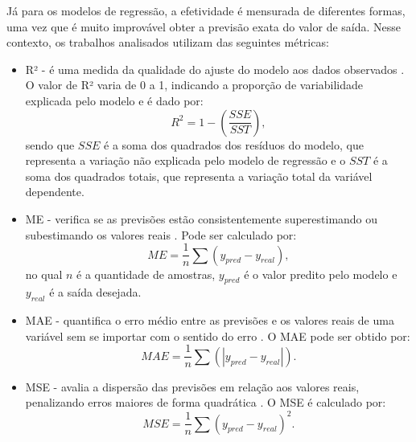 Já para os modelos de regressão, a efetividade é mensurada de diferentes formas, uma vez que é muito improvável obter a previsão exata do valor de saída. Nesse contexto, os trabalhos analisados utilizam das seguintes métricas: 

\begin{itemize}
    \item \ac{R²} - é uma medida da qualidade do ajuste do modelo aos dados observados \cite{Charlene, Jian_Forecasting}. O valor de R² varia de 0 a 1, indicando a proporção de variabilidade explicada pelo modelo e é dado por:
    \begin{equation}
        \label{R²}
        R^2 = 1- \left(\frac{SSE}{SST}\right),
    \end{equation}
    sendo que $SSE$ é a soma dos quadrados dos resíduos do modelo, que representa a variação não explicada pelo modelo de regressão e o $SST$ é a soma dos quadrados totais, que representa a variação total da variável dependente.
    
    \item \ac{ME} - verifica se as previsões estão consistentemente superestimando ou subestimando os valores reais \cite{Leonardo_Comparative}. Pode ser calculado por:
    \begin{equation}
        \label{eq:ME}
        ME = \frac{1}{n} \sum(y_{pred} - y_{real}),
    \end{equation}
    no qual $n$ é a quantidade de amostras, $y_{pred}$ é o valor predito pelo modelo e $y_{real}$ é a saída desejada.
    
    \item \ac{MAE} - quantifica o erro médio entre as previsões e os valores reais de uma variável sem se importar com o sentido do erro \cite{Amin_Aminimehr_Comprehensive, Manrui_two-stage}. O \ac{MAE} pode ser obtido por:
    \begin{equation}
        \label{eq:MAE}
        MAE = \frac{1}{n} \sum(|y_{pred} - y_{real}|).
    \end{equation}
    
    \item \ac{MSE} - avalia a dispersão das previsões em relação aos valores reais, penalizando erros maiores de forma quadrática \cite{Jian_Forecasting, Chaojie_Stock}. O \ac{MSE} é calculado por:
    \begin{equation}
        \label{eq:MSE}
        MSE = \frac{1}{n} \sum(y_{pred} - y_{real})^2.
    \end{equation}
    

\end{itemize}
